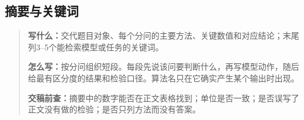 \subsection{摘要与关键词}
\begin{quote}\small
\noindent\textbf{\color{inkblue}写什么：}交代题目对象、每个分问的主要方法、关键数值和对应结论；末尾列3--5个能检索模型或任务的关键词。\par
\noindent\textbf{\color{inkblue}怎么写：}按分问组织短段。每段先说该问要判断什么，再写模型动作，随后给最有区分度的结果和检验口径。算法名只在它确实产生某个输出时出现。\par
\noindent\textbf{\color{inkblue}交稿前查：}摘要中的数字能否在正文表格找到；单位是否一致；是否误写了正文没有做的检验；是否只列方法而没有答案。
\end{quote}


